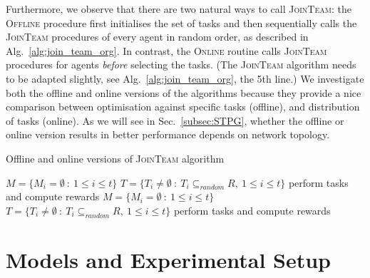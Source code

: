 \documentclass{llncs}
\begin{document}
Furthermore, we observe that there are two natural ways to call \textsc{JoinTeam}: the \textsc{Offline} procedure first initialises the set of tasks and then sequentially calls the \textsc{JoinTeam} procedures of every agent in random order, as described in Alg.~\ref{alg:join_team_org}. In contrast, the \textsc{Online} routine calls \textsc{JoinTeam} procedures for agents \emph{before} selecting the tasks. (The \textsc{JoinTeam} algorithm needs to be adapted slightly, see Alg.~\ref{alg:join_team_org}, the 5th line.)  We investigate both the offline and online versions of the algorithms because they provide a nice comparison between optimisation against specific tasks (offline), and distribution of tasks (online). As we will see in Sec.~\ref{subsec:STPG}, whether the offline or online version results in better performance depends on network topology.

\begin{algorithm}[h]
\caption{Offline and online versions of \textsc{JoinTeam} algorithm}
\label{alg:main_process}
\begin{scriptsize}
\begin{algorithmic}
 
  \State $M = \{M_i = \emptyset\ :\ 1\leq i \leq t\}$ 
  \State $T = \{T_i\neq \emptyset\ :\ T_i \subseteq_{random} R,\ 1\leq i \leq t\}$ 
    \State {}
  \EndFor
  \State perform tasks and compute rewards
\EndProcedure
\Statex
{} 
  \State $M = \{M_i = \emptyset\ :\ 1\leq i \leq t\}$ 
    \State {}
  \EndFor
  \State $T = \{T_i\neq \emptyset\ :\ T_i \subseteq_{random} R,\ 1\leq i \leq t\}$ 
  \State perform tasks and compute rewards
\EndProcedure
\end{algorithmic}
\end{scriptsize}
\end{algorithm}

\section{Models and Experimental Setup}
\end{document}
